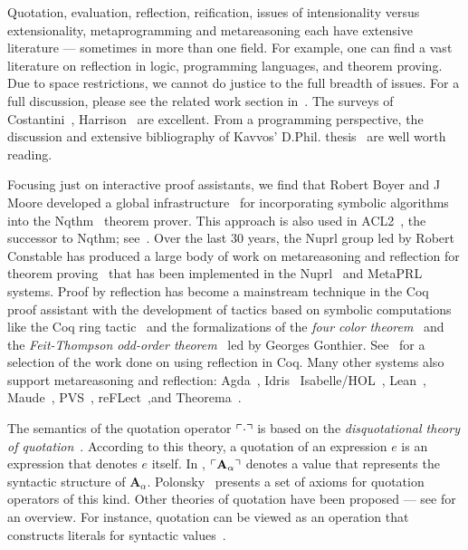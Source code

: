 \documentclass[fleqn]{llncs}
\begin{document}
Quotation, evaluation, reflection, reification, issues of
intensionality versus extensionality, metaprogramming and
metareasoning each have extensive literature --- sometimes
in more than one field.  For example, one can find a
vast literature on reflection in logic, programming languages,
and theorem proving. Due to space restrictions, we cannot
do justice to the full breadth of issues. For a full discussion,
please see the related work section in~\cite{Farmer18}.
The surveys of Costantini~\cite{Costantini02},
Harrison~\cite{Harrison95} are excellent. From a
programming perspective, the discussion and extensive 
bibliography of Kavvos' D.Phil. thesis~\cite{Kavvos2017}
are well worth reading.

Focusing just on interactive proof assistants, we find
that Robert Boyer and J Moore developed a global
infrastructure~\cite{BoyerMoore81} for
incorporating symbolic algorithms into the Nqthm~\cite{BoyerMoore88}
theorem prover.  This approach is also used in
ACL2~\cite{KaufmannMoore97}, the successor to Nqthm;
see~\cite{HuntEtAl05}.  Over the last 30 years, the Nuprl group led
by Robert Constable has produced a large body of work on metareasoning
and reflection for theorem
proving~\cite{AllenEtAl90,Barzilay05,Constable95,Howe92,KnoblockConstable86,Nogin05,Yu07}
that has been implemented in the Nuprl~\cite{Constable86} and
MetaPRL~\cite{HickeyEtAl03} systems.  Proof by reflection has become a
mainstream technique in the Coq~\cite{Coq8.5} proof assistant with the
development of tactics based on symbolic computations like the Coq
ring tactic~\cite{Boutin97,GregoireMahboubi05} and the formalizations
of the \emph{four color theorem}~\cite{Gonthier08} and the
\emph{Feit-Thompson odd-order theorem}~\cite{GonthierEtAl13} led by
Georges Gonthier.
See~\cite{Boutin97,BraibantPous11,Chlipala13,gonthier2010introduction,GregoireMahboubi05,JamesHinze09,OostdijkGeuvers02}
for a selection of the work done on using reflection in Coq.
Many other systems also support metareasoning and reflection:
Agda~\cite{Norell09,VanDerWalt12,VanDerWaltSwierstra12},
Idris~\cite{Christiansen:2014,Christiansen:2016,Christiansen:2016:Thesis}
Isabelle/HOL~\cite{ChaiebNipkow08},
Lean~\cite{ebner2017metaprogramming},
Maude~\cite{ClavelMeseguer02}, 
PVS~\cite{VonHenkeEtAl98}, 
reFLect~\cite{GrundyEtAl06,MelhamEtAl13},and
Theorema~\cite{GieseBuchberger07,BuchbergerEtAl06}.

The semantics of the quotation operator $\ulcorner\cdot\urcorner$ is based on
the \emph{disquotational theory of quotation}~\cite{Quotation12}.
According to this theory, a quotation of an expression $e$ is an
expression that denotes $e$ itself.  In {\churchqe},
$\ulcorner\textbf{A}_\alpha\urcorner$ denotes a value that represents the
syntactic structure of $\textbf{A}_\alpha$.  Polonsky~\cite{Polonsky11} 
presents a set of axioms for quotation operators of this
kind.  Other theories of quotation have been proposed --- see
\cite{Quotation12} for an overview.  For instance, quotation can be viewed as
an operation that constructs literals for syntactic values~\cite{Rabe15}.
\end{document}
